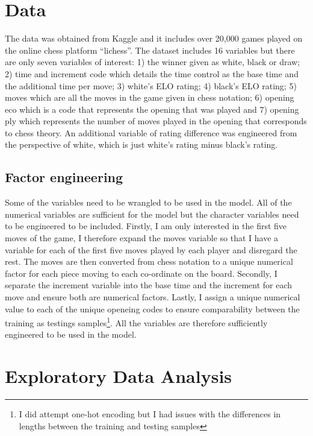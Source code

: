 \documentclass[12pt,preprint, authoryear]{elsarticle}
\numberwithin{equation}{section}
\numberwithin{figure}{section}
\numberwithin{table}{section}
\let\rmarkdownfootnote\footnote%
\def\footnote{\protect\rmarkdownfootnote}
\begin{document}
\hypertarget{data}{%
\section{Data}\label{data}}

The data was obtained from Kaggle and it includes over 20,000 games
played on the online chess platform ``lichess''. The dataset includes 16
variables but there are only seven variables of interest: 1) the winner
given as white, black or draw; 2) time and increment code which details
the time control as the base time and the additional time per move; 3)
white's ELO rating; 4) black's ELO rating; 5) moves which are all the
moves in the game given in chess notation; 6) opening eco which is a
code that represents the opening that was played and 7) opening ply
which represents the number of moves played in the opening that
corresponds to chess theory. An additional variable of rating difference
was engineered from the perspective of white, which is just white's
rating minus black's rating.

\hypertarget{factor-engineering}{%
\subsection{Factor engineering}\label{factor-engineering}}

Some of the variables need to be wrangled to be used in the model. All
of the numerical variables are sufficient for the model but the
character variables need to be engineered to be included. Firstly, I am
only interested in the first five moves of the game, I therefore expand
the moves variable so that I have a variable for each of the first five
moves played by each player and disregard the rest. The moves are then
converted from chess notation to a unique numerical factor for each
piece moving to each co-ordinate on the board. Secondly, I separate the
increment variable into the base time and the increment for each move
and ensure both are numerical factors. Lastly, I assign a unique
numerical value to each of the unique openeing codes to ensure
comparability between the training as testings
samples\footnote{I did attempt one-hot encoding but I had issues with the differences in lengths between the training and testing samples}.
All the variables are therefore sufficiently engineered to be used in
the model.

\hypertarget{exploratory-data-analysis}{%
\section{Exploratory Data Analysis}\label{exploratory-data-analysis}}
\end{document}
